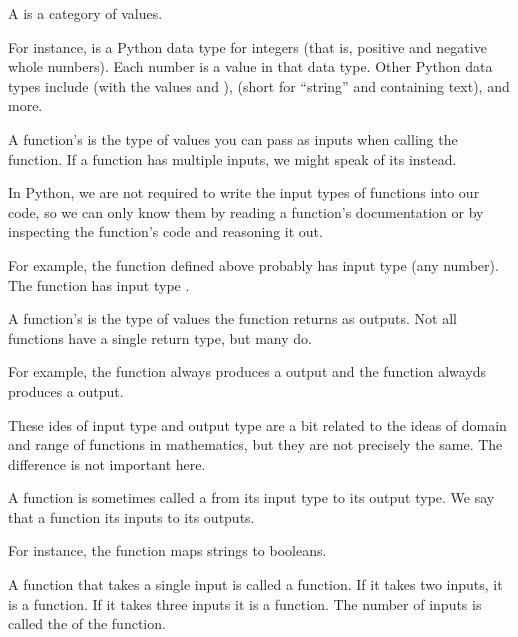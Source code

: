 \documentclass[letterpaper,10pt,english]{sphinxmanual}
\begin{document}
 A  is a category of values.

For instance,  is a Python data type for integers (that is, positive and negative whole numbers).  Each number is a value in that data type.  Other Python data types include  (with the values  and ),  (short for “string” and containing text), and more.

 A function’s  is the type of values you can pass as inputs when calling the function.  If a function has multiple inputs, we might speak of its  instead.

In Python, we are not required to write the input types of functions into our code, so we can only know them by reading a function’s documentation or by inspecting the function’s code and reasoning it out.

For example, the  function defined above probably has input type  (any number).  The  function has input type .

 A function’s  is the type of values the function returns as outputs.  Not all functions have a single return type, but many do.

For example, the  function always produces a  output and the  function alwayds produces a  output.

These ides of input type and output type are a bit related to the ideas of domain and range of functions in mathematics, but they are not precisely the same.  The difference is not important here.

 A function is sometimes called a  from its input type to its output type.  We say that a function  its inputs to its outputs.

For instance, the  function maps strings to booleans.

 A function that takes a single input is called a  function.  If it takes two inputs, it is a  function.  If it takes three inputs it is a  function.  The number of inputs is called the  of the function.
\end{document}

